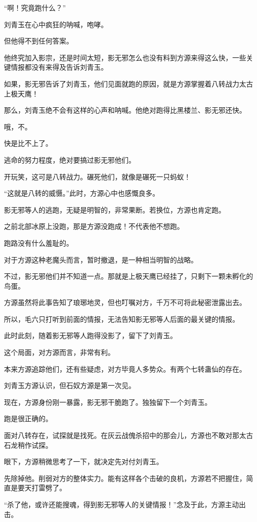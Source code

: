 \begin{this_body}
“啊！究竟跑什么？”

刘青玉在心中疯狂的呐喊，咆哮。

但他得不到任何答案。

他终究加入影宗，还是时间太短，影无邪怎么也没有料到方源来得这么快，一些关键情报都没有来得及告诉刘青玉。

如果，影无邪告诉了刘青玉，他们见面就跑的原因，就是方源掌握着八转战力太古上极天鹰！

那么，刘青玉绝不会有这样的心声和呐喊。他绝对跑得比黑楼兰、影无邪还快。

哦，不。

快是比不上了。

逃命的努力程度，绝对要搞过影无邪他们。

开玩笑，这可是八转战力。碾死他们，就像是碾死一只蚂蚁！

“这就是八转的威慑。”此时，方源心中也感慨良多。

影无邪等人的逃跑，无疑是明智的，非常果断。若换位，方源也肯定跑。

之前北部冰原上没跑，那是方源没跑成！不代表他不想跑。

跑路没有什么羞耻的。

对于方源这种老魔头而言，暂时撤退，是一种相当明智的战略。

不过，影无邪他们并不知道一点。那就是上极天鹰已经挂了，只剩下一颗未孵化的鸟蛋。

方源虽然将此事告知了琅琊地灵，但也叮嘱对方，千万不可将此秘密泄露出去。

所以，毛六只打听到前面的情报，无法告知影无邪等人后面的最关键的情报。

此时此刻，随着影无邪等人跑得没影了，留下了刘青玉。

这个局面，对方源而言，非常有利。

本来方源追踪他们，还有些疑虑，对方毕竟人多势众。有两个七转蛊仙的存在。

刘青玉方源认识，但石奴方源是第一次见。

现在，方源身份刚一暴露，影无邪干脆跑了。独独留下一个刘青玉。

跑是很正确的。

面对八转存在，试探就是找死。在灰云战傀杀招中的那会儿，方源也不敢对那太古石龙稍作试探。

眼下，方源稍微思考了一下，就决定先对付刘青玉。

先除掉他。削弱对方的整体实力。能有这样各个击破的良机，方源若不把握住，简直是要天打雷劈了。

“杀了他，或许还能搜魂，得到影无邪等人的关键情报！”念及于此，方源主动出击。


\end{this_body}
